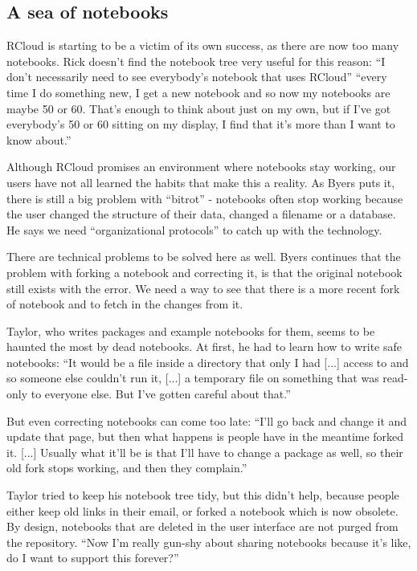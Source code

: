 

\subsection{A sea of notebooks}
RCloud is starting to be a victim of its own success, as there are now too many
notebooks.  Rick doesn't find the notebook tree very useful for this reason: ``I
don't necessarily need to see everybody's notebook that uses RCloud'' ``every
time I do something new, I get a new notebook and so now my notebooks are maybe
50 or 60. That's enough to think about just on my own, but if I've got
everybody's 50 or 60 sitting on my display, I find that it's more than I want to
know about.''

Although RCloud promises an environment where notebooks stay working, our users
have not all learned the habits that make this a reality. As Byers puts it,
there is still a big problem with ``bitrot'' - notebooks often stop working
because the user changed the structure of their data, changed a filename or a
database.  He says we need ``organizational protocols'' to catch up with the
technology.

There are technical problems to be solved here as well. Byers continues that the
problem with forking a notebook and correcting it, is that the original notebook
still exists with the error.  We need a way to see that there is a more recent
fork of notebook and to fetch in the changes from it.

Taylor, who writes packages and example notebooks for them, seems to be
haunted the most by dead notebooks.  At first, he had to learn how to write safe
notebooks: ``It would be a file inside a directory that only I had [...] access
to and so someone else couldn't run it, [...] a temporary file on something that
was read-only to everyone else. But I've gotten careful about that.''

But even correcting notebooks can come too late: ``I'll go back and change it and update
that page, but then what happens is people have in the meantime forked it. [...]
Usually what it'll be is that I'll have to change a package as well, so
their old fork stops working, and then they complain.''

Taylor tried to keep his notebook tree tidy, but this didn't help, because
people either keep old links in their email, or forked a notebook which is now
obsolete. By design, notebooks that are deleted in the user interface are not
purged from the repository. ``Now I'm really gun-shy about sharing notebooks
because it's like, do I want to support this forever?''

